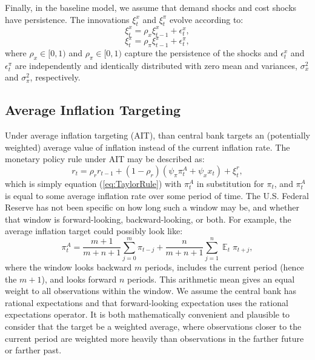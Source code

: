 \documentclass[english,authoryear,12pt]{elsarticle}
\DeclareMathOperator{\E}{\mathbb{E}}
\begin{document}
Finally, in the baseline model, we assume that demand shocks and cost shocks have persistence. The innovations $\xi_t^x$ and $\xi_t^\pi$ evolve according to:
\begin{equation}\label{eq:demandshock}
	\xi_t^x = \rho_x \xi_{t-1}^x + \epsilon_t^x,
\end{equation}
\begin{equation}\label{eq:costshock}
	\xi_t^\pi = \rho_\pi \xi_{t-1}^\pi + \epsilon_t^\pi,
\end{equation}
where $\rho_x\in [0,1)$ and $\rho_\pi \in [0,1)$ capture the persistence of the shocks and $\epsilon_t^x$ and $\epsilon_t^\pi$ are independently and identically distributed with zero mean and variances, $\sigma_x^2$ and $\sigma_\pi^2$, respectively.

\subsection{Average Inflation Targeting}

Under average inflation targeting (AIT), than central bank targets an (potentially weighted) average value of inflation instead of the current inflation rate. The monetary policy rule under AIT may be described as: 
\begin{equation}\label{eq:TaylorRuleAIT}
	r_t = \rho_r r_{t-1} + (1-\rho_r) \left( \psi_\pi \pi_t^A + \psi_x x_t \right) + \xi_t^{r},
\end{equation}
which is simply equation (\ref{eq:TaylorRule}) with $\pi_t^A$ in substitution for $\pi_t$, and $\pi_t^A$ is equal to some average inflation rate over some period of time. The U.S. Federal Reserve has not been specific on how long such a window may be, and whether that window is forward-looking, backward-looking, or both. For example, the average inflation target could possibly look like:
\begin{equation}\label{eq:ait}
	\pi_t^A = \frac{m+1}{m+n+1}\sum_{j=0}^{m} \pi_{t-j} + \frac{n}{m+n+1}\sum_{j=1}^{n} \E_t \pi_{t+j},
\end{equation}
where the window looks backward $m$ periods, includes the current period (hence the $m+1$), and looks forward $n$ periods.  This arithmetic mean gives an equal weight to all observations within the window. We assume the central bank has rational expectations and that forward-looking expectation uses the rational expectations operator. It is both mathematically convenient and plausible to consider that the target be a weighted average, where observations closer to the current period are weighted more heavily than observations in the farther future or farther past. 
\end{document}
